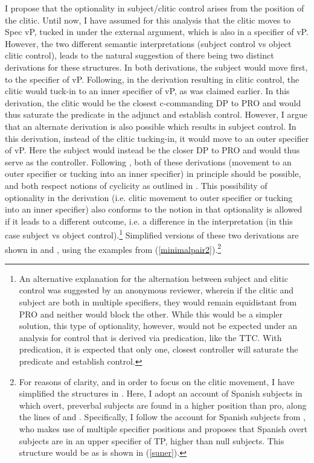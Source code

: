\documentclass[output=paper,colorlinks,citecolor=brown]{langscibook}
\begin{document}
I propose that the optionality in subject/clitic control arises from the position of the clitic. Until now, I have assumed for this analysis that the clitic moves to Spec vP, tucked in under the external argument, which is also in a specifier of vP. However, the two different semantic interpretations (subject control vs object clitic control), leads to the natural suggestion of there being two distinct derivations for these structures. In both derivations, the subject would move first, to the specifier of vP. Following, in the derivation resulting in clitic control, the clitic would tuck-in to an inner specifier of vP, as was claimed earlier. In this derivation, the clitic would be the closest c-commanding DP to PRO and would thus saturate the predicate in the adjunct and establish control. However, I argue that an alternate derivation is also possible which results in subject control. In this derivation, instead of the clitic tucking-in, it would move to an outer specifier of vP. Here the subject would instead be the closer DP to PRO and would thus serve as the controller. Following \cite{richards1997moves}, both of these derivations (movement to an outer specifier or tucking into an inner specifier) in principle should be possible, and both respect notions of cyclicity as outlined in \citet{chomsky19954minimalist}. This possibility of optionality in the derivation (i.e. clitic movement to outer specifier or tucking into an inner specifier) also conforms to the notion in \citet[34]{chomsky2001derivation} that optionality is allowed if it leads to a different outcome, i.e. a difference in the interpretation (in this case subject vs object control).\footnote{An alternative explanation for the alternation between subject and clitic control was suggested by an anonymous reviewer, wherein if the clitic and subject are both in multiple specifiers, they would remain equidistant from PRO and neither would block the other. While this would be a simpler solution, this type of optionality, however, would not be expected under an analysis for control that is derived via predication, like the TTC. With predication, it is expected that only one, closest controller will saturate the predicate and establish control.} Simplified versions of these two derivations are shown in  and , using the examples from (\ref{minimalpair2}).\footnote{For reasons of clarity, and in order to focus on the clitic movement, I have simplified the structures in . Here, I adopt an account of Spanish subjects in which overt, preverbal subjects are found in a higher position than pro, along the lines of \citet{cardinalettiRoberts} and \citet{cardinaletti1997}. Specifically, I follow the account for Spanish subjects from \citet{suner2003lexical}, who makes use of multiple specifier positions and proposes that Spanish overt subjects are in an upper specifier of TP, higher than null subjects. This structure would be as is shown in (\ref{suner}).
}
\end{document}
